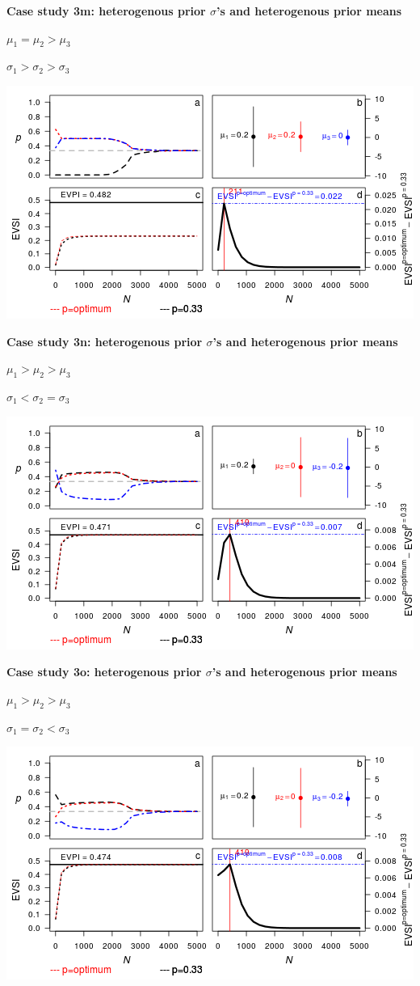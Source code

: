\documentclass[]{article}
\theoremstyle{definition}
\theoremstyle{definition}
\theoremstyle{remark}
\begin{document}
\textbf{Case study 3m: heterogenous prior \(\sigma\)'s and heterogenous
prior means}

\(\mu_1 = \mu_2 > \mu_3\)

\(\sigma_1 > \sigma_2 > \sigma_3\)

\includegraphics{figure/x110___1__1_1c-1.png} \clearpage

\textbf{Case study 3n: heterogenous prior \(\sigma\)'s and heterogenous
prior means}

\(\mu_1 > \mu_2 > \mu_3\)

\(\sigma_1 < \sigma_2 = \sigma_3\)

\includegraphics{figure/x10n1_1__1__1c-1.png} \clearpage

\textbf{Case study 3o: heterogenous prior \(\sigma\)'s and heterogenous
prior means}

\(\mu_1 > \mu_2 > \mu_3\)

\(\sigma_1 = \sigma_2 < \sigma_3\)

\includegraphics{figure/x10n1__1__1_1c-1.png} \clearpage
\end{document}
